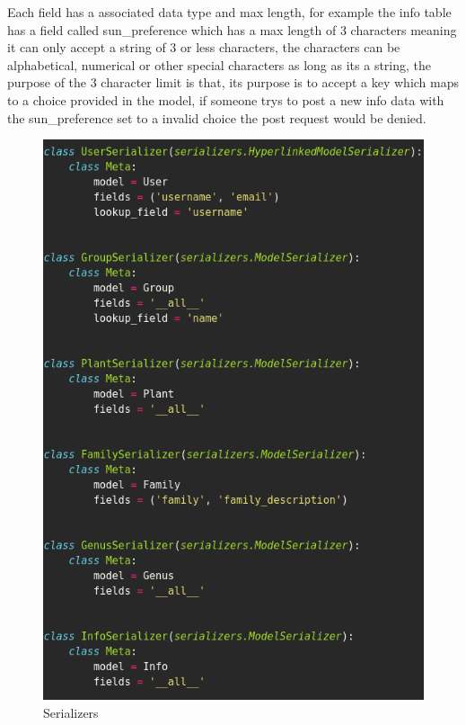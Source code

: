\documentclass{article}
\begin{document}
    Each field has a associated data type and max length, for example the info table has a field called sun\_preference which has a max length of 3 characters meaning it can only accept a string of 3 or less characters, the characters can be alphabetical, numerical or other special characters as long as its a string, the purpose of the 3 character limit is that, its purpose is to accept a key which maps to a choice provided in the model, if someone trys to post a new info data with the sun\_preference set to a invalid choice the post request would be denied.
    

    \begin{figure}[!htb]
        \centering
        \caption{Serializers}
        \includegraphics[scale=0.40]{serializers1}
    \end{figure}
\end{document}
